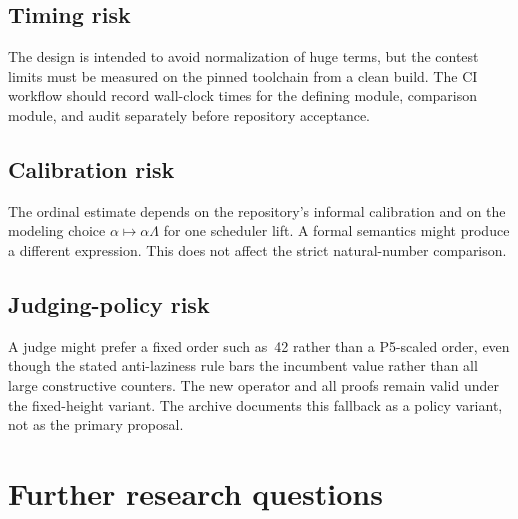 \documentclass[11pt]{article}
\theoremstyle{definition}
\theoremstyle{remark}
\begin{document}
\subsection{Timing risk}

The design is intended to avoid normalization of huge terms, but the contest
limits must be measured on the pinned toolchain from a clean build.  The CI
workflow should record wall-clock times for the defining module, comparison
module, and audit separately before repository acceptance.

\subsection{Calibration risk}

The ordinal estimate depends on the repository's informal calibration and on
the modeling choice \(\alpha\mapsto\alpha\Lambda\) for one scheduler lift.  A
formal semantics might produce a different expression.  This does not affect
the strict natural-number comparison.

\subsection{Judging-policy risk}

A judge might prefer a fixed order such as~42 rather than a P5-scaled order,
even though the stated anti-laziness rule bars the incumbent value rather than
all large constructive counters.  The new operator and all proofs remain valid
under the fixed-height variant.  The archive documents this fallback as a
policy variant, not as the primary proposal.

\section{Further research questions}
\end{document}
